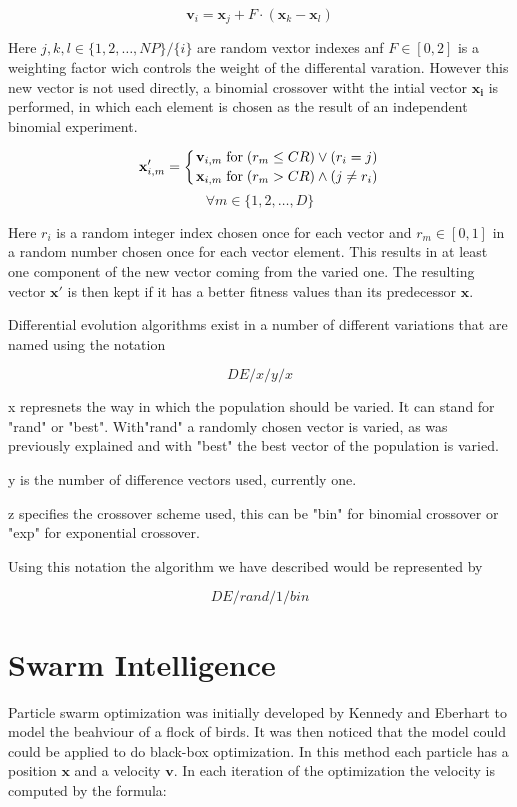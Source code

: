 \documentclass[a4paper,titlepage]{report}
\begin{document}
\[ \mathbf{v}_{i} = \mathbf{x}_{j} + F \cdot ( \mathbf{x}_{k} -  \mathbf{x}_{l} ) \]

Here $j,k,l \in \{1,2,\dots,NP\} / \{i\}$ are random vextor indexes anf $F \in [0,2]$ is a weighting factor wich controls the weight of the differental varation. However this new vector is not used directly, a binomial crossover witht the intial vector $\mathbf{x_i}$ is performed, in which each element is chosen as the result of an independent binomial experiment.

\newcommand*{\bfrac}[2]{\genfrac{}{}{0pt}{}{#1}{#2}}

\[ \mathbf{x}'_{i,m} = \left\{ \bfrac{ \mathbf{v}_{i,m} \; \text{for}\; (r_m \le CR) \lor (r_i = j) }{ \mathbf{x}_{i,m} \;\text{for}\; (r_m > CR) \land (j \ne r_i) } \right. \]
\[ \forall m \in \{1,2,\dots,D\} \]

Here $r_i$ is a random integer index chosen once for each vector and $r_m \in [0,1]$ in a random number chosen once for each vector element. This results in at least one component of the new vector coming from the varied one. The resulting vector $\mathbf{x}'$ is then kept if it has a better fitness values than its predecessor $\mathbf{x}$.

Differential evolution algorithms exist in a number of different variations that are named using the notation

\[DE/x/y/x\]

x represnets the way in which the population should be varied. It can stand for "rand" or "best". With"rand" a randomly chosen vector is varied, as was previously explained and with "best" the best vector of the population is varied.

y is the number of difference vectors used, currently one.

z specifies the crossover scheme used, this can be "bin" for binomial crossover or "exp" for exponential crossover.

Using this notation the algorithm we have described would be represented by

\[DE/rand/1/bin\]



\section{Swarm Intelligence}

Particle swarm optimization was initially developed by Kennedy and Eberhart to model the beahviour of a flock of birds. It was then noticed that the model could could be applied to do black-box optimization. In this method each particle has a position $\mathbf{x}$ and a velocity $\mathbf{v}$. In each iteration of the optimization the velocity is computed by the formula:
\end{document}
